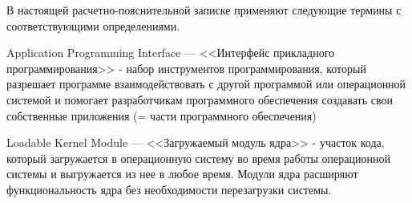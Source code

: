 
В настоящей расчетно-пояснительной записке применяют следующие термины с соответствующими определениями.\\

\begin{description}[leftmargin=0pt]
	\item \noindent Application Programming Interface --- <<Интерфейс прикладного программирования>> -
	набор инструментов программирования,
	который разрешает программе взаимодействовать с другой программой или операционной системой
	и помогает разработчикам программного обеспечения создавать свои собственные приложения
	(= части программного обеспечения)\cite{API-definition}\\
	\item \noindent Loadable Kernel Module --- <<Загружаемый модуль ядра>> -
	участок кода, который загружается в операционную систему во время работы операционной системы
	и выгружается из нее в любое время.
	Модули ядра расширяют функциональность ядра без необходимости перезагрузки системы.\cite{LKM-definition}
\end{description}

